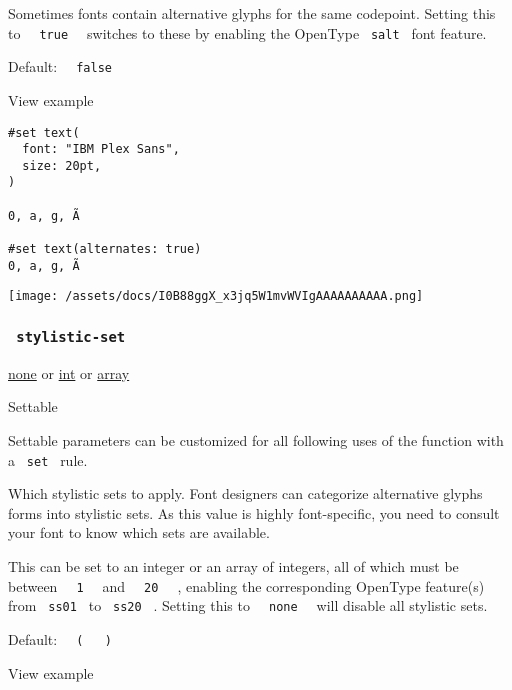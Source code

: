 Sometimes fonts contain alternative glyphs for the same codepoint.
Setting this to \texttt{\ }{\texttt{\ true\ }}\texttt{\ } switches to
these by enabling the OpenType \texttt{\ salt\ } font feature.

Default: \texttt{\ }{\texttt{\ false\ }}\texttt{\ }


View example

\begin{verbatim}
#set text(
  font: "IBM Plex Sans",
  size: 20pt,
)

0, a, g, Ã

#set text(alternates: true)
0, a, g, Ã
\end{verbatim}

\texttt{[image: /assets/docs/I0B88ggX\_x3jq5W1mvWVIgAAAAAAAAAA.png]}

\subsubsection{\texorpdfstring{\texttt{\ stylistic-set\ }}{ stylistic-set }}\label{parameters-stylistic-set}

\href{/docs/reference/foundations/none/}{none} {or}
\href{/docs/reference/foundations/int/}{int} {or}
\href{/docs/reference/foundations/array/}{array}

{{ Settable }}

\label{parameters-stylistic-set-settable-tooltip}
Settable parameters can be customized for all following uses of the
function with a \texttt{\ set\ } rule.

Which stylistic sets to apply. Font designers can categorize alternative
glyphs forms into stylistic sets. As this value is highly font-specific,
you need to consult your font to know which sets are available.

This can be set to an integer or an array of integers, all of which must
be between \texttt{\ }{\texttt{\ 1\ }}\texttt{\ } and
\texttt{\ }{\texttt{\ 20\ }}\texttt{\ } , enabling the corresponding
OpenType feature(s) from \texttt{\ ss01\ } to \texttt{\ ss20\ } .
Setting this to \texttt{\ }{\texttt{\ none\ }}\texttt{\ } will disable
all stylistic sets.

Default:
\texttt{\ }{\texttt{\ (\ }}\texttt{\ }{\texttt{\ )\ }}\texttt{\ }


View example

